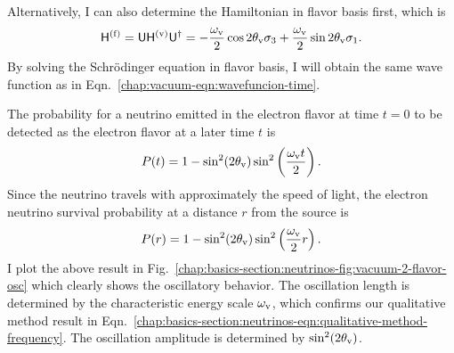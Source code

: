 Alternatively, I can also determine the Hamiltonian in flavor basis first, which is
\begin{equation}
\mathsf H^{(\ff)} = \mathsf U \mathsf H^{(\vv)} \mathsf U^\dagger = -\frac{\omega_\vv}{2}\cos 2\theta_\vv \sigma_3 + \frac{\omega_\vv}{2} \sin 2\theta_\vv \sigma_1.
    \label{chap:basics-sec:vacuum-osc-eqn:hamiltonian-vacuum}
\end{equation}
By solving the Schr\"{o}dinger equation in flavor basis, I will obtain the same wave function as in Eqn.~\ref{chap:vacuum-eqn:wavefuncion-time}.

The probability for a neutrino emitted in the electron flavor at time $t=0$ to be detected as the electron flavor at a later time $t$ is
\begin{equation}
P(t) = 1-\sin^2(2\theta_\mathrm v)\sin^2\left( \frac{\omega_\mathrm v t}{2} \right).
\end{equation}
Since the neutrino travels with approximately the speed of light, the electron neutrino survival probability at a distance $r$ from the source is
\begin{equation}
P(r) =  1-\sin^2(2\theta_\vv)\sin^2\left( \frac{\omega_\vv}{2} r \right).
\label{chap:basics-eqn:vacuum-electron-probability}
\end{equation}
I plot the above result in Fig.~\ref{chap:basics-section:neutrinos-fig:vacuum-2-flavor-osc} which clearly shows the oscillatory behavior. The oscillation length is determined by the characteristic energy scale $\omega_\mathrm v$, which confirms our qualitative method result in Eqn.~\ref{chap:basics-section:neutrinos-eqn:qualitative-method-frequency}. The oscillation amplitude is determined by $\sin^2(2\theta_\mathrm v)$.

